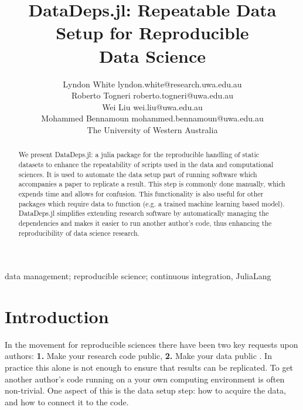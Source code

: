 \documentclass[twoside,11pt]{article}
\begin{document}
\title{DataDeps.jl: Repeatable Data Setup for Reproducible\\ Data Science}
\author{%
	\name Lyndon White \email lyndon.white@research.uwa.edu.au\\
	\name Roberto Togneri \email roberto.togneri@uwa.edu.au\\
	\name Wei Liu \email wei.liu@uwa.edu.au\\
	\name Mohammed Bennamoun \email mohammed.bennamoun@uwa.edu.au\\
	The University of Western Australia 
}
\editor{}


\maketitle

\begin{abstract}
	We present DataDeps.jl: a julia package for the reproducible handling of static datasets to enhance the repeatability of scripts used in the data and computational sciences.
	It is used to automate the data setup part of running software which accompanies a paper to replicate a result.
	This step is commonly done manually, which expends time and allows for confusion.
	This functionality is also useful for other packages which require data to function (e.g. a trained machine learning based model).
	DataDeps.jl simplifies extending research software by automatically managing the dependencies and makes it easier to run another author's code, thus enhancing the reproducibility of data science research.
\end{abstract}

\begin{keywords}
data management;  reproducible science; continuous integration, JuliaLang
\end{keywords}

\section{Introduction}

In the movement for reproducible sciences there have been two key requests upon authors:
\textbf{1.} Make your research code public, \textbf{2.} Make your data public \citep{lookafterdata}.
In practice this alone is not enough to ensure that results can be replicated.
To get another author's code running on a your own computing environment is often non-trivial.
One aspect of this is the data setup step: how to acquire the data, and how to connect it to the code.
\end{document}

